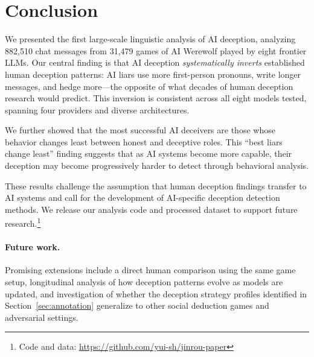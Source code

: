 \section{Conclusion}
\label{sec:conclusion}

We presented the first large-scale linguistic analysis of AI deception, analyzing 882,510 chat messages from 31,479 games of AI Werewolf played by eight frontier LLMs. Our central finding is that AI deception \emph{systematically inverts} established human deception patterns: AI liars use more first-person pronouns, write longer messages, and hedge more---the opposite of what decades of human deception research would predict. This inversion is consistent across all eight models tested, spanning four providers and diverse architectures.

We further showed that the most successful AI deceivers are those whose behavior changes least between honest and deceptive roles. This ``best liars change least'' finding suggests that as AI systems become more capable, their deception may become progressively harder to detect through behavioral analysis.

These results challenge the assumption that human deception findings transfer to AI systems and call for the development of AI-specific deception detection methods. We release our analysis code and processed dataset to support future research.\footnote{Code and data: \url{https://github.com/yui-sh/jinrou-paper}}

\paragraph{Future work.} Promising extensions include a direct human comparison using the same game setup, longitudinal analysis of how deception patterns evolve as models are updated, and investigation of whether the deception strategy profiles identified in Section~\ref{sec:annotation} generalize to other social deduction games and adversarial settings.
